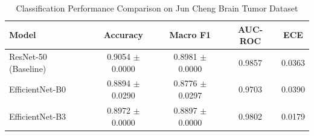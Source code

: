 \begin{table}[!h]
\caption{Classification Performance Comparison on Jun Cheng Brain Tumor Dataset}
\label{tab:main_results}
\centering
\begin{tabular}{lcccc}
\hline
\textbf{Model} & \textbf{Accuracy} & \textbf{Macro F1} & \textbf{AUC-ROC} & \textbf{ECE} \\
\hline
ResNet-50 (Baseline) & 0.9054 $\pm$ 0.0000 & 0.8981 $\pm$ 0.0000 & 0.9857 & 0.0363 \\
EfficientNet-B0 & 0.8894 $\pm$ 0.0290 & 0.8776 $\pm$ 0.0297 & 0.9703 & 0.0390 \\
EfficientNet-B3 & 0.8972 $\pm$ 0.0000 & 0.8897 $\pm$ 0.0000 & 0.9802 & 0.0179 \\
\hline
\end{tabular}
\end{table}
